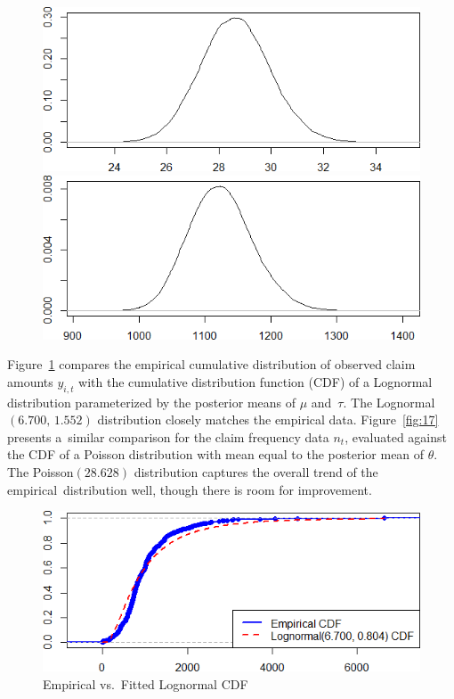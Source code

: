 \documentclass{Class/julia}
\begin{document}
\begin{figure}[!ht]
    \begin{minipage}{0.45\textwidth}
        \centering
        \includegraphics[width=\textwidth]{itamtplcost/density_theta.png}
        \subcaption{\( \theta \)}
    \end{minipage}%
    \hfill
    \begin{minipage}{0.45\textwidth}
        \centering
        \includegraphics[width=\textwidth]{itamtplcost/density_E_y.png}
    \end{minipage}
    
\end{figure}

Figure~\ref{fig:16} compares the empirical cumulative distribution of observed claim amounts \( y_{i,t} \) with the cumulative distribution function (CDF) of a Lognormal distribution parameterized by the posterior means of \( \mu \) and~\( \tau \). The Lognormal\((6.700,\,1.552)\) distribution closely matches the empirical data. Figure~\ref{fig:17} presents a~similar comparison for the claim frequency data \( n_t \), evaluated against the CDF of a Poisson distribution with mean equal to the posterior mean of \( \theta \). The Poisson\((28.628)\) distribution captures the overall trend of the empirical~distribution well, though there is room for improvement.

\begin{figure}[!ht]
    \centering
    \caption{Empirical vs.\ Fitted Lognormal CDF}
    \label{fig:16}
    \includegraphics[width=.75\textwidth]{itamtplcost/empirical_vs_lognormal.png}
\end{figure}
\end{document}
